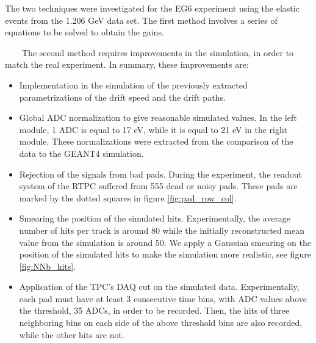 The two techniques were investigated for the EG6 experiment using the elastic 
events from the 1.206 GeV data set. The first method involves a series of 
equations to be solved to obtain the gains.
 
~~~~The second method requires improvements in the simulation, in order to 
match the real experiment. In summary, these improvements are:
\begin{itemize}
\item Implementation in the simulation of the previously extracted 
   parametrizations of the drift speed and the drift paths.
\item Global ADC normalization to give reasonable simulated values. In the left 
   module, 1 ADC is equal to 17 eV, while it is equal to 21 eV in the right 
   module. These normalizations were extracted from the comparison of the data 
   to the GEANT4 simulation.
\item Rejection of the signals from bad pads. During the experiment, the 
   readout system of the RTPC suffered from 555 dead or noisy pads. These pads 
   are marked by the dotted squares in figure \ref{fig:pad_row_col}.
\item Smearing the position of the simulated hits. Experimentally, the average 
   number of hits per track is around 80 while the initially reconstructed mean 
   value from the simulation is around 50. We apply a Gaussian smearing on the 
   position of the simulated hits to make the simulation more realistic, see 
   figure \ref{fig:NNb_hits}.  
\item Application of the TPC's DAQ cut on the simulated data. Experimentally, 
   each pad must have at least 3 consecutive time bins, with ADC values above 
   the threshold, 35 ADCs, in order to be recorded. Then, the hits of three 
   neighboring bins on each side of the above threshold bins are also recorded, 
   while the other hits are not.
\end{itemize} 

